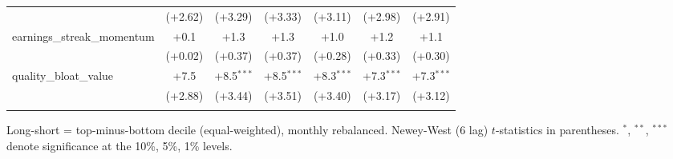 \begin{table}[htbp]
\begin{threeparttable}
\begin{tabular}{lcccccc}
 & (+2.62) & (+3.29) & (+3.33) & (+3.11) & (+2.98) & (+2.91) \\
\addlinespace
earnings\_streak\_momentum & +0.1 & +1.3 & +1.3 & +1.0 & +1.2 & +1.1 \\
 & (+0.02) & (+0.37) & (+0.37) & (+0.28) & (+0.33) & (+0.30) \\
\addlinespace
quality\_bloat\_value & +7.5 & +8.5$^{***}$ & +8.5$^{***}$ & +8.3$^{***}$ & +7.3$^{***}$ & +7.3$^{***}$ \\
 & (+2.88) & (+3.44) & (+3.51) & (+3.40) & (+3.17) & (+3.12) \\
\addlinespace
\bottomrule
\end{tabular}
\begin{tablenotes}\footnotesize
\item Long-short = top-minus-bottom decile (equal-weighted), monthly rebalanced. Newey-West (6 lag) $t$-statistics in parentheses. $^{*}$, $^{**}$, $^{***}$ denote significance at the 10\%, 5\%, 1\% levels.
\end{tablenotes}
\end{threeparttable}
\end{table}